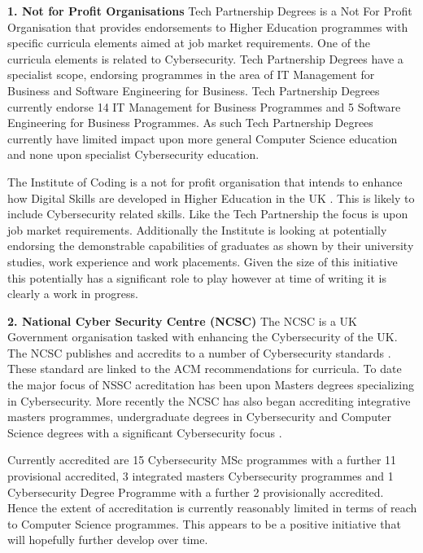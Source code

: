 \documentclass[conference]{IEEEtran}
\begin{document}
\textbf{1. Not for Profit Organisations}
Tech Partnership Degrees is a Not For Profit Organisation that provides endorsements to Higher Education programmes with specific curricula elements aimed at job market requirements. One of the curricula elements is related to Cybersecurity. Tech Partnership Degrees have a specialist scope, endorsing programmes in the area of IT Management for Business and Software Engineering for Business.  Tech Partnership Degrees currently endorse 14 IT Management for Business Programmes and 5 Software Engineering for Business Programmes. As such Tech Partnership Degrees currently have limited impact upon more general Computer Science education and none upon specialist Cybersecurity education. 

The Institute of Coding is a not for profit organisation that intends to enhance how Digital Skills are developed in Higher Education in the UK \cite{Davenportetal2019a}. This is likely to include Cybersecurity related skills. Like the Tech Partnership the focus is upon job market requirements. Additionally the Institute is looking at potentially endorsing the demonstrable capabilities of graduates as shown by their university studies, work experience and work placements. Given the size of this initiative this potentially has a significant role to play however at time of writing it is clearly a work in progress.

\textbf{2. National Cyber Security Centre (NCSC)}
The NCSC is a UK Government organisation tasked with enhancing the Cybersecurity of the UK. The NCSC publishes and accredits to a number of Cybersecurity standards \cite{NCSC2018a}. These standard are linked to the ACM recommendations for curricula. To date the major focus of NSSC acreditation has been upon Masters degrees specializing in Cybersecurity. More recently the NCSC has also began accrediting integrative masters programmes, undergraduate degrees in Cybersecurity and Computer Science degrees with a significant Cybersecurity focus \cite{NCSC2018b}.

Currently accredited are 15 Cybersecurity MSc programmes with a further 11 provisional accredited, 3 integrated masters Cybersecurity programmes and 1 Cybersecurity Degree Programme with a further 2 provisionally accredited. Hence the extent of accreditation is currently reasonably limited in terms of reach to Computer Science programmes. This appears to be a positive initiative that will hopefully further develop over time. 
\end{document}
